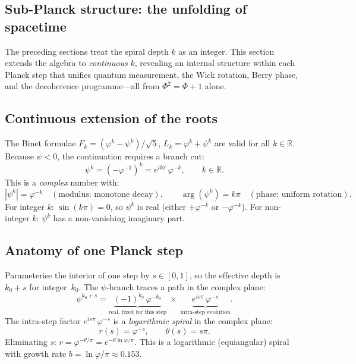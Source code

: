 \documentclass[12pt,a4paper]{article}
\begin{document}


\subsection{Sub-Planck structure: the unfolding of spacetime}
\label{sec:subplanck-breathing}


The preceding sections treat the spiral depth $k$ as an integer. This section extends the algebra to \emph{continuous} $k$, revealing an internal structure within each Planck step that unifies quantum measurement, the Wick rotation, Berry phase, and the decoherence programme---all from $\Phi^2 = \Phi + 1$ alone.

\subsection{Continuous extension of the roots}
\label{sec:continuous-k}

The Binet formulae $F_k = (\varphi^k - \psi^k)/\sqrt{5}$, $L_k = \varphi^k + \psi^k$ are valid for all $k \in \mathbb{R}$. Because $\psi < 0$, the continuation requires a branch cut:
\begin{equation}
\psi^k = (-\varphi^{-1})^k = e^{ik\pi}\,\varphi^{-k}, \qquad k \in \mathbb{R}.
\label{eq:psi-polar}
\end{equation}
This is a \emph{complex} number with:
\begin{equation}
|\psi^k| = \varphi^{-k} \quad (\text{modulus: monotone decay}), \qquad \arg(\psi^k) = k\pi \quad (\text{phase: uniform rotation}).
\end{equation}
For integer $k$: $\sin(k\pi) = 0$, so $\psi^k$ is real (either $+\varphi^{-k}$ or $-\varphi^{-k}$). For non-integer $k$: $\psi^k$ has a non-vanishing imaginary part.

\subsection{Anatomy of one Planck step}

Parameterise the interior of one step by $s \in [0,1]$, so the effective depth is $k_0 + s$ for integer~$k_0$. The $\psi$-branch traces a path in the complex plane:
\begin{equation}
\psi^{k_0+s} = \underbrace{(-1)^{k_0}\,\varphi^{-k_0}}_{\text{real, fixed for this step}} \;\times\; \underbrace{e^{is\pi}\,\varphi^{-s}}_{\text{intra-step evolution}}.
\label{eq:intra-step}
\end{equation}
The intra-step factor $e^{is\pi}\,\varphi^{-s}$ is a \emph{logarithmic spiral} in the complex plane:
\begin{equation}
r(s) = \varphi^{-s}, \qquad \theta(s) = s\pi.
\end{equation}
Eliminating $s$: $r = \varphi^{-\theta/\pi} = e^{-\theta\ln\varphi/\pi}$. This is a logarithmic (equiangular) spiral with growth rate $b = \ln\varphi/\pi \approx 0.153$.
\end{document}
